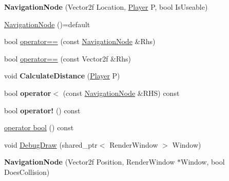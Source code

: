 \begin{DoxyCompactItemize}
\item 
\mbox{\label{struct_engine_1_1_core_1_1_navigation_node_a4070cf10d7b0ba6c5e5275d3e380dff6}} 
{\bfseries Navigation\+Node} (Vector2f Location, \hyperlink{class_engine_1_1_game_play_1_1_player}{Player} P, bool Is\+Useable)
\item 
\hyperlink{struct_engine_1_1_core_1_1_navigation_node_a30f4beef1fa861c8f363fd4a87f6ba98}{Navigation\+Node} ()=default
\item 
bool \hyperlink{struct_engine_1_1_core_1_1_navigation_node_a12cffe89f89aac9623ae2530dd556dc7}{operator==} (const \hyperlink{struct_engine_1_1_core_1_1_navigation_node}{Navigation\+Node} \&Rhs)
\item 
bool \hyperlink{struct_engine_1_1_core_1_1_navigation_node_a4093291628771c2de79b2b1a8ea2ec82}{operator==} (const Vector2f \&Rhs)
\item 
\mbox{\label{struct_engine_1_1_core_1_1_navigation_node_ac61bc4291a133693de436a3e875c8c39}} 
void {\bfseries Calculate\+Distance} (\hyperlink{class_engine_1_1_game_play_1_1_player}{Player} P)
\item 
\mbox{\label{struct_engine_1_1_core_1_1_navigation_node_a23ce6291fb2ee4c9c4fb254e2ad61dcd}} 
bool {\bfseries operator$<$} (const \hyperlink{struct_engine_1_1_core_1_1_navigation_node}{Navigation\+Node} \&R\+HS) const
\item 
\mbox{\label{struct_engine_1_1_core_1_1_navigation_node_abd4ea3e64c92a2d40d16e6c7e259c394}} 
bool {\bfseries operator!} () const
\item 
\hyperlink{struct_engine_1_1_core_1_1_navigation_node_a6435f925c6b28774a025f5650bd76b56}{operator bool} () const
\item 
void \hyperlink{struct_engine_1_1_core_1_1_navigation_node_a453d05d915929841a1f3d8f228996d37}{Debug\+Draw} (shared\+\_\+ptr$<$ Render\+Window $>$ Window)
\item 
\mbox{\label{struct_engine_1_1_core_1_1_navigation_node_a060f7bb5425bb51c63853c843676f29b}} 
{\bfseries Navigation\+Node} (Vector2f Position, Render\+Window $\ast$Window, bool Does\+Collision)

\end{DoxyCompactItemize}
